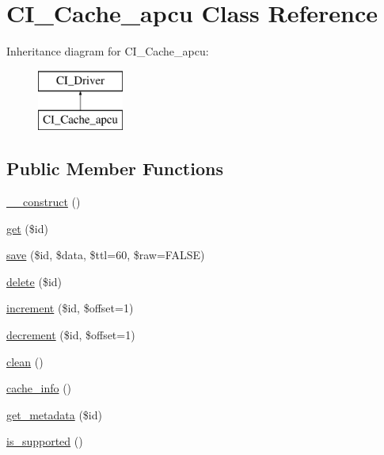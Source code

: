 \hypertarget{class_c_i___cache__apcu}{}\section{C\+I\+\_\+\+Cache\+\_\+apcu Class Reference}
\label{class_c_i___cache__apcu}
Inheritance diagram for C\+I\+\_\+\+Cache\+\_\+apcu\+:\begin{figure}[H]
\begin{center}
\leavevmode
\includegraphics[height=2.000000cm]{class_c_i___cache__apcu}
\end{center}
\end{figure}
\subsection*{Public Member Functions}
\begin{DoxyCompactItemize}
\item 
\mbox{\hyperlink{class_c_i___cache__apcu_a095c5d389db211932136b53f25f39685}{\+\_\+\+\_\+construct}} ()
\item 
\mbox{\hyperlink{class_c_i___cache__apcu_a50e3bfb586b2f42932a6a93f3fbb0828}{get}} (\$id)
\item 
\mbox{\hyperlink{class_c_i___cache__apcu_a472645db04a8ce4b040b789a3062a7d2}{save}} (\$id, \$data, \$ttl=60, \$raw=F\+A\+L\+SE)
\item 
\mbox{\hyperlink{class_c_i___cache__apcu_a2f8258add505482d7f00ea26493a5723}{delete}} (\$id)
\item 
\mbox{\hyperlink{class_c_i___cache__apcu_a2f07a4e09b57f4460d49852497d1808f}{increment}} (\$id, \$offset=1)
\item 
\mbox{\hyperlink{class_c_i___cache__apcu_a4eb1c2772c8efc48c411ea060dd040b7}{decrement}} (\$id, \$offset=1)
\item 
\mbox{\hyperlink{class_c_i___cache__apcu_adb40b812890a8bc058bf6b7a0e1a54d9}{clean}} ()
\item 
\mbox{\hyperlink{class_c_i___cache__apcu_acb4742926a6fa901e4f0917e1a35ef4c}{cache\+\_\+info}} ()
\item 
\mbox{\hyperlink{class_c_i___cache__apcu_a59635cf18e997c5141bffa05ff7622e0}{get\+\_\+metadata}} (\$id)
\item 
\mbox{\hyperlink{class_c_i___cache__apcu_a98c68fd153468bc148c4ed8c716859fc}{is\+\_\+supported}} ()
\end{DoxyCompactItemize}
